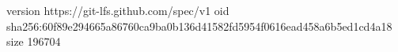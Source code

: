 version https://git-lfs.github.com/spec/v1
oid sha256:60f89e294665a86760ca9ba0b136d41582fd5954f0616ead458a6b5ed1cd4a18
size 196704
